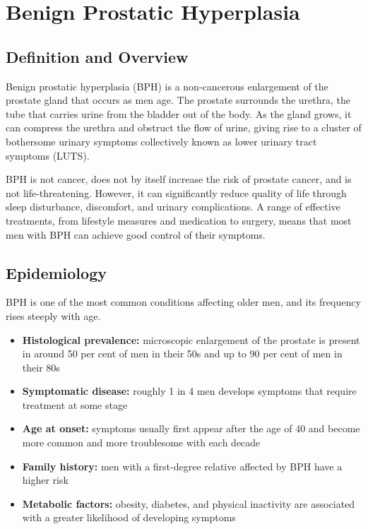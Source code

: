 \chapter{Benign Prostatic Hyperplasia}

\section*{Definition and Overview}
Benign prostatic hyperplasia (BPH) is a non-cancerous enlargement of the prostate gland that occurs as men age. The prostate surrounds the urethra, the tube that carries urine from the bladder out of the body. As the gland grows, it can compress the urethra and obstruct the flow of urine, giving rise to a cluster of bothersome urinary symptoms collectively known as lower urinary tract symptoms (LUTS).

BPH is not cancer, does not by itself increase the risk of prostate cancer, and is not life-threatening. However, it can significantly reduce quality of life through sleep disturbance, discomfort, and urinary complications. A range of effective treatments, from lifestyle measures and medication to surgery, means that most men with BPH can achieve good control of their symptoms.

\section*{Epidemiology}
BPH is one of the most common conditions affecting older men, and its frequency rises steeply with age.

\begin{itemize}
    \item \textbf{Histological prevalence:} microscopic enlargement of the prostate is present in around 50 per cent of men in their 50s and up to 90 per cent of men in their 80s
    \item \textbf{Symptomatic disease:} roughly 1 in 4 men develops symptoms that require treatment at some stage
    \item \textbf{Age at onset:} symptoms usually first appear after the age of 40 and become more common and more troublesome with each decade
    \item \textbf{Family history:} men with a first-degree relative affected by BPH have a higher risk
    \item \textbf{Metabolic factors:} obesity, diabetes, and physical inactivity are associated with a greater likelihood of developing symptoms
\end{itemize}


